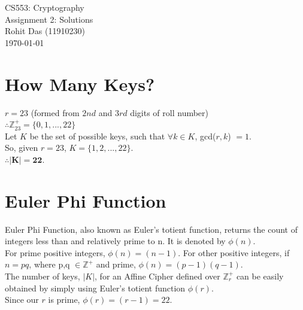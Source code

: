 \documentclass[12pt]{article}
\begin{document}
\begin{titlepage}
\centering
\vspace*{\fill}
\huge CS553: Cryptography\\
\LARGE Assignment 2: Solutions\\
\Large Rohit Das (11910230)\\\vspace{0.8cm}
\today
\vspace*{\fill}
\end{titlepage}

\section{How Many Keys?}
\begin{large}
$r = 23$ (formed from $2nd$ and $3rd$ digits of roll number)\\
$\therefore \mathbb{Z}^{+}_{23} = \{0,1,...,22\}$\\
Let $K$ be the set of possible keys, such that $\forall	k \in K$, gcd($r,k$) $= 1$.\\
So, given $r = 23$, $K = \{1,2,...,22\}$.\\
$\mathbf{\therefore |K| = 22}$.
\end{large}

\section{Euler Phi Function}
\begin{large}
Euler Phi Function, also known as Euler's totient function, returns the count of integers less than and relatively prime to n. It is denoted by $\phi(n)$.\\
For prime positive integers, $\phi(n) = (n - 1)$. For other positive integers, if $n = pq$, where p,q $\in \mathbb{Z}^{+}$ and prime, $\phi(n) = (p - 1)(q - 1)$.\\
The number of keys, $|K|$, for an Affine Cipher defined over $\mathbb{Z}^{+}_{r}$ can be easily obtained by simply using Euler's totient function $\phi(r)$.\\
Since our $r$ is prime, $\phi(r) = (r - 1) = 22$.
\end{large}
\end{document}
